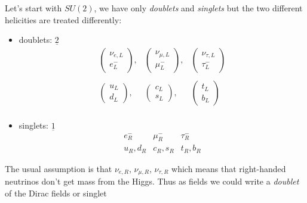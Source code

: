 Let's start with $SU(2)$, we have only \textit{doublets} and \textit{singlets} but the two different helicities are treated differently: 
\begin{itemize}
    \item doublets: $\underline{2}$
    \begin{equation}
        \begin{matrix}
            \begin{pmatrix}
                \nu_{e,L}\\
                e^{-}_{L}
            \end{pmatrix}, &
            \begin{pmatrix}
                \nu_{\mu,L}\\
                \mu^{-}_{L}
            \end{pmatrix}, &
            \begin{pmatrix}
                \nu_{\tau,L}\\
                \tau^{-}_{L}
            \end{pmatrix}\\ \\
            \begin{pmatrix}
                u_L\\
                d_L
            \end{pmatrix}, &
            \begin{pmatrix}
                c_L\\
                s_L
            \end{pmatrix}, &
            \begin{pmatrix}
                t_L\\
                b_L
            \end{pmatrix}\\
        \end{matrix}
    \end{equation}
    \item singlets: $\underline{1}$
    \begin{equation}
        \begin{matrix}
            e^-_R & \mu^-_R& \tau^-_R\\
            u_R, d_R& c_R, s_R & t_R, b_R
        \end{matrix}
    \end{equation}
\end{itemize}

The usual assumption is that $\nu_{e,R}$, $\nu_{\mu,R}$, $\nu_{\tau,R}$ which means that right-handed neutrinos don't get mass from the Higgs. Thus as fields we could write a \textit{doublet} of the Dirac fields or singlet


